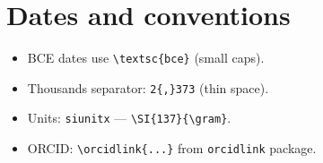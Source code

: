 \documentclass[11pt]{article}
\begin{document}
\section{Dates and conventions}

\begin{itemize}[nosep]
\item BCE dates use \texttt{\textbackslash textsc\{bce\}}
  (small caps).
\item Thousands separator: \texttt{2\{,\}373} (thin space).
\item Units: \texttt{siunitx} ---
  \texttt{\textbackslash SI\{137\}\{\textbackslash gram\}}.
\item ORCID: \texttt{\textbackslash orcidlink\{...\}} from
  \texttt{orcidlink} package.
\end{itemize}
\end{document}
